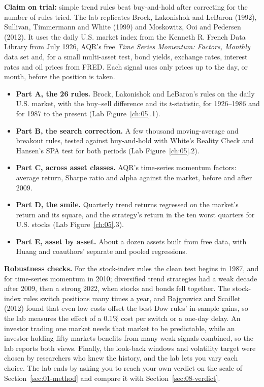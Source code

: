 \textbf{Claim on trial:} simple trend rules beat buy-and-hold after correcting for the number of rules tried. The lab replicates Brock, Lakonishok and LeBaron (1992), Sullivan, Timmermann and White (1999) and Moskowitz, Ooi and Pedersen (2012). It uses the daily U.S. market index from the Kenneth R. French Data Library from July 1926, AQR's free \emph{Time Series Momentum: Factors, Monthly} data set and, for a small multi-asset test, bond yields, exchange rates, interest rates and oil prices from FRED. Each signal uses only prices up to the day, or month, before the position is taken.

\begin{itemize}
  \item \textbf{Part A, the 26 rules.} Brock, Lakonishok and LeBaron's rules on the daily U.S. market, with the buy--sell difference and its $t$-statistic, for 1926--1986 and for 1987 to the present (Lab Figure~\ref{ch:05}.1).
  \item \textbf{Part B, the search correction.} A few thousand moving-average and breakout rules, tested against buy-and-hold with White's Reality Check and Hansen's SPA test for both periods (Lab Figure~\ref{ch:05}.2).
  \item \textbf{Part C, across asset classes.} AQR's time-series momentum factors: average return, Sharpe ratio and alpha against the market, before and after 2009.
  \item \textbf{Part D, the smile.} Quarterly trend returns regressed on the market's return and its square, and the strategy's return in the ten worst quarters for U.S. stocks (Lab Figure~\ref{ch:05}.3).
  \item \textbf{Part E, asset by asset.} About a dozen assets built from free data, with Huang and coauthors' separate and pooled regressions.
\end{itemize}


\label{sec:08-stress}
\textbf{Robustness checks.} For the stock-index rules the clean test begins in 1987, and for time-series momentum in 2010; diversified trend strategies had a weak decade after 2009, then a strong 2022, when stocks and bonds fell together. The stock-index rules switch positions many times a year, and Bajgrowicz and Scaillet (2012) found that even low costs offset the best Dow rules' in-sample gains, so the lab measures the effect of a 0.1\% cost per switch or a one-day delay. An investor trading one market needs that market to be predictable, while an investor holding fifty markets benefits from many weak signals combined, so the lab reports both views. Finally, the look-back windows and volatility target were chosen by researchers who knew the history, and the lab lets you vary each choice. The lab ends by asking you to reach your own verdict on the scale of Section~\ref{sec:01-method} and compare it with Section~\ref{sec:08-verdict}.

